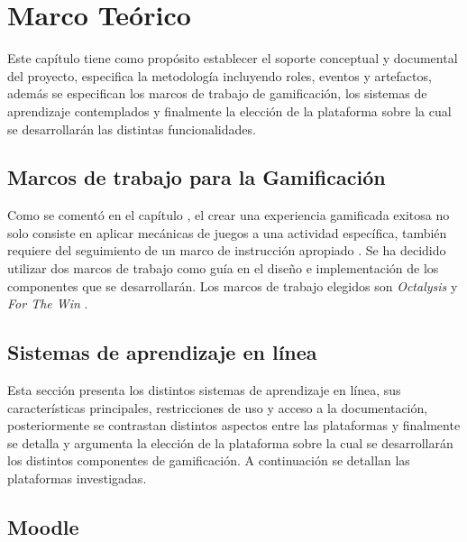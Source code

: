 \chapter{Marco Teórico}
\label{ch:marcoTeorico}

 Este capítulo tiene como propósito establecer el soporte conceptual y documental del proyecto,
 especifica la metodología incluyendo roles, eventos y artefactos, además se especifican los
 marcos de trabajo de gamificación, los sistemas de aprendizaje contemplados y finalmente
 la elección de la plataforma sobre la cual se desarrollarán las distintas funcionalidades.

    

\section{Marcos de trabajo para la Gamificación}

 Como se comentó en el capítulo , el crear una experiencia
 gamificada exitosa no solo consiste en aplicar mecánicas de juegos a una actividad
 específica, también requiere del seguimiento de un marco de instrucción apropiado \cite[p. 1110]{GamInE-Learning}.
 Se ha decidido utilizar dos marcos de trabajo como guía en el diseño e implementación
 de los componentes que se desarrollarán. Los marcos de trabajo elegidos son {\it Octalysis}
 \cite{Octalysis} y {\it For The Win} \cite{ForTheWin}.

    
    

\clearpage
\section{Sistemas de aprendizaje en línea}
\label{sec:sistemasaprendizaje}

 Esta sección presenta los distintos sistemas de aprendizaje en línea, sus características
 principales, restricciones de uso y acceso a la documentación, posteriormente se contrastan
 distintos aspectos entre las plataformas y finalmente se detalla y argumenta la elección de
 la plataforma sobre la cual se desarrollarán los distintos componentes de gamificación.
 A continuación se detallan las plataformas investigadas.

    

\clearpage
\section{Moodle}

